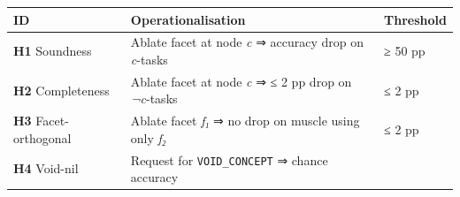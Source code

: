 \begin{longtable}[]{@{}lll@{}}
\toprule
\begin{minipage}[b]{0.10\columnwidth}\raggedright
ID\strut
\end{minipage} & \begin{minipage}[b]{0.52\columnwidth}\raggedright
Operationalisation\strut
\end{minipage} & \begin{minipage}[b]{0.29\columnwidth}\raggedright
Threshold\strut
\end{minipage}\tabularnewline
\midrule
\endhead
\begin{minipage}[t]{0.10\columnwidth}\raggedright
\textbf{H1} Soundness\strut
\end{minipage} & \begin{minipage}[t]{0.52\columnwidth}\raggedright
Ablate facet at node \emph{c} ⇒ accuracy drop on \emph{c}-tasks\strut
\end{minipage} & \begin{minipage}[t]{0.29\columnwidth}\raggedright
≥ 50 pp\strut
\end{minipage}\tabularnewline
\begin{minipage}[t]{0.10\columnwidth}\raggedright
\textbf{H2} Completeness\strut
\end{minipage} & \begin{minipage}[t]{0.52\columnwidth}\raggedright
Ablate facet at node \emph{c} ⇒ ≤ 2 pp drop on \emph{¬c}-tasks\strut
\end{minipage} & \begin{minipage}[t]{0.29\columnwidth}\raggedright
≤ 2 pp\strut
\end{minipage}\tabularnewline
\begin{minipage}[t]{0.10\columnwidth}\raggedright
\textbf{H3} Facet-orthogonal\strut
\end{minipage} & \begin{minipage}[t]{0.52\columnwidth}\raggedright
Ablate facet \emph{f₁} ⇒ no drop on muscle using only \emph{f₂}\strut
\end{minipage} & \begin{minipage}[t]{0.29\columnwidth}\raggedright
≤ 2 pp\strut
\end{minipage}\tabularnewline
\begin{minipage}[t]{0.10\columnwidth}\raggedright
\textbf{H4} Void-nil\strut
\end{minipage} & \begin{minipage}[t]{0.52\columnwidth}\raggedright
Request for \texttt{VOID\_CONCEPT} ⇒ chance accuracy\strut

\end{minipage}
\end{longtable}
